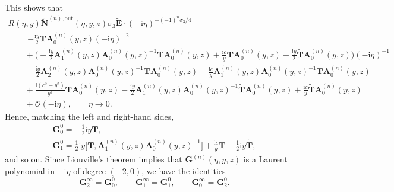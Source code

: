 \noindent
 This shows that
\begin{gather*}
R(\eta,y)\breve{\mathbf{N}}^{(n),\mathrm{out}}(\eta,y,z)\sigma_3\widetilde{\mathbf{E}}\cdot(-\mathrm{i}\eta)^{-(-1)^n\sigma_3/4}\\
\quad{} =-\frac{\mathrm{i} y}{2}\mathbf{T}\mathbf{A}_0^{(n)}(y,z) (-\mathrm{i}\eta)^{-2} \\
 \qquad{}+ \biggl(-\frac{\mathrm{i} y}{2} \mathbf{A}_1^{(n)}(y,z)\mathbf{A}_0^{(n)}(y,z)^{-1}\mathbf{T}\mathbf{A}_0^{(n)}(y,z)+\frac{\mathrm{i} c}{y}\mathbf{T}\mathbf{A}_0^{(n)}(y,z)-\frac{\mathrm{i} y}{2}\widetilde{\mathbf{T}}\mathbf{A}_0^{(n)}(y,z)\biggr)(-\mathrm{i}\eta)^{-1} \\
 \qquad{}-\frac{\mathrm{i} y}{2}\mathbf{A}_2^{(n)}(y,z)\mathbf{A}_0^{(n)}(y,z)^{-1}\mathbf{T}\mathbf{A}_0^{(n)}(y,z)+\frac{\mathrm{i} c}{y}\mathbf{A}_1^{(n)}(y,z)\mathbf{A}_0^{(n)}(y,z)^{-1}\mathbf{T}\mathbf{A}_0^{(n)}(y,z)\\
 \qquad{}+\frac{\mathrm{i} (c^2+y^2)}{y^4}\mathbf{T}\mathbf{A}_0^{(n)}(y,z) -\frac{\mathrm{i} y}{2}\mathbf{A}_1^{(n)}(y,z)\mathbf{A}_0^{(n)}(y,z)^{-1}\widetilde{\mathbf{T}}\mathbf{A}_0^{(n)}(y,z) +\frac{\mathrm{i} c}{y}\widetilde{\mathbf{T}}\mathbf{A}_0^{(n)}(y,z) \\
 \qquad{}+\mathcal{O}(-\mathrm{i}\eta),\qquad\eta\to 0.
\end{gather*}
Hence, matching the left and right-hand sides,
\begin{gather*}
\mathbf{G}_0^0=-\tfrac{1}{2}\mathrm{i} y\mathbf{T},
\\
\mathbf{G}_1^0=\tfrac{1}{2}\mathrm{i} y\big[\mathbf{T},\mathbf{A}_1^{(n)}(y,z)\mathbf{A}_0^{(n)}(y,z)^{-1}\big]+\frac{\mathrm{i} c}{y}\mathbf{T}-\tfrac{1}{2}\mathrm{i} y\widetilde{\mathbf{T}},
\end{gather*}
and so on. Since Liouville's theorem implies that $\mathbf{G}^{(n)}(\eta,y,z)$ is a Laurent polynomial in $-\mathrm{i}\eta$ of degree $(-2,0)$, we have the identities
\begin{equation*}
\mathbf{G}^\infty_2=\mathbf{G}_0^0,\qquad\mathbf{G}^\infty_1=\mathbf{G}_1^0,\qquad\mathbf{G}^\infty_0=\mathbf{G}_2^0.
\end{equation*}
